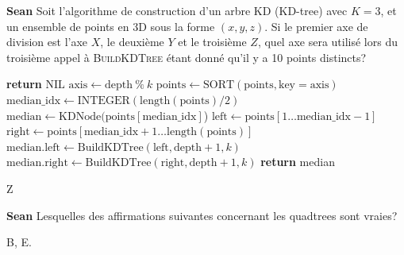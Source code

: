 \begin{Exercice}[5 minutes]\textbf{Sean}
Soit l'algorithme de construction d'un arbre KD (KD-tree) avec $K=3$, et un ensemble de points en 3D sous la forme $(x, y, z)$.
Si le premier axe de division est l'axe $X$, le deuxième $Y$ et le troisième $Z$, quel axe sera utilisé lors du troisième appel à \textsc{BuildKDTree} étant donné qu'il y a 10 points distincts?

\begin{algorithm}[H]
\caption{BuildKDTree($\text{points}, \text{depth}, k$)}
\label{alg:kdtree-build}
\begin{algorithmic}[1]
    \State \textbf{return} $\text{NIL}$
\EndIf
\State $\text{axis} \leftarrow \text{depth} \ \% \ k$ 
\State $\text{points} \leftarrow \text{SORT}(\text{points}, \text{key} = \text{axis})$ 
\State $\text{median\_idx} \leftarrow \text{INTEGER}(\text{length}(\text{points}) / 2 )$ 
\State $\text{median} \leftarrow \text{KDNode}(\text{points}[\text{median\_idx}]$)
\State $\text{left} \leftarrow \text{points}[1 \ldots \text{median\_idx} - 1]$ 
\State $\text{right} \leftarrow \text{points}[\text{median\_idx} + 1 \ldots \text{length}(\text{points})]$ 
\State $\text{median.left} \leftarrow \text{BuildKDTree}(\text{left}, \text{depth} + 1, k)$
\State $\text{median.right} \leftarrow \text{BuildKDTree}(\text{right}, \text{depth} + 1, k)$
\State \textbf{return} median
\end{algorithmic}
\end{algorithm}


\begin{solution}
Z
\end{solution}

\end{Exercice}

\begin{Exercice}[5 minutes]\textbf{Sean}
Lesquelles des affirmations suivantes concernant les quadtrees sont vraies?


\begin{solution}
B, E. 
\end{solution}
 

\end{Exercice}



